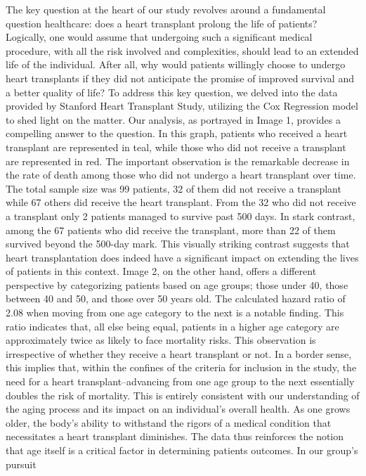 \documentclass[
  letterpaper,
  DIV=11,
  numbers=noendperiod]{scrreprt}
\begin{document}
The key question at the heart of our study revolves around a fundamental
question healthcare: does a heart transplant prolong the life of
patients? Logically, one would assume that undergoing such a significant
medical procedure, with all the risk involved and complexities, should
lead to an extended life of the individual. After all, why would
patients willingly choose to undergo heart transplants if they did not
anticipate the promise of improved survival and a better quality of
life? To address this key question, we delved into the data provided by
Stanford Heart Transplant Study, utilizing the Cox Regression model to
shed light on the matter. Our analysis, as portrayed in Image 1,
provides a compelling answer to the question. In this graph, patients
who received a heart transplant are represented in teal, while those who
did not receive a transplant are represented in red. The important
observation is the remarkable decrease in the rate of death among those
who did not undergo a heart transplant over time. The total sample size
was 99 patients, 32 of them did not receive a transplant while 67 others
did receive the heart transplant. From the 32 who did not receive a
transplant only 2 patients managed to survive past 500 days. In stark
contrast, among the 67 patients who did receive the transplant, more
than 22 of them survived beyond the 500-day mark. This visually striking
contrast suggests that heart transplantation does indeed have a
significant impact on extending the lives of patients in this context.
Image 2, on the other hand, offers a different perspective by
categorizing patients based on age groups; those under 40, those between
40 and 50, and those over 50 years old. The calculated hazard ratio of
2.08 when moving from one age category to the next is a notable finding.
This ratio indicates that, all else being equal, patients in a higher
age category are approximately twice as likely to face mortality risks.
This observation is irrespective of whether they receive a heart
transplant or not. In a border sense, this implies that, within the
confines of the criteria for inclusion in the study, the need for a
heart transplant--advancing from one age group to the next essentially
doubles the risk of mortality. This is entirely consistent with our
understanding of the aging process and its impact on an individual's
overall health. As one grows older, the body's ability to withstand the
rigors of a medical condition that necessitates a heart transplant
diminishes. The data thus reinforces the notion that age itself is a
critical factor in determining patients outcomes. In our group's pursuit
\end{document}
